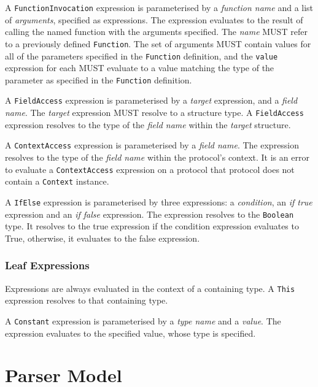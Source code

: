 \documentclass[10pt,twocolumn,a4paper]{article}
\newcommand{\code}[1]{\texttt{#1}}
\begin{document}
A \code{FunctionInvocation} expression is parameterised by a \emph{function name} and a list of
\emph{arguments}, specified as expressions. The expression evaluates to the result of
calling the named function with the arguments specified. The \emph{name} MUST refer to
a previously defined \code{Function}. The set
of arguments MUST contain values for all of the parameters specified
in the \code{Function} definition, and the \code{value} expression for each
MUST evaluate to a value matching the type of the parameter as specified in
the \code{Function} definition.

A \code{FieldAccess} expression is parameterised by a \emph{target} expression, and a
\emph{field name}. The \emph{target} expression MUST resolve to a structure type. A
\code{FieldAccess} expression resolves to the type of the \emph{field name} within the
\emph{target} structure.

A \code{ContextAccess} expression is parameterised by a \emph{field name}. The expression
resolves to the type of the \emph{field name} within the protocol's context.
It is an error to evaluate a \code{ContextAccess} expression on a protocol
that protocol does not contain a \code{Context} instance.

A \code{IfElse} expression is parameterised by three expressions: a \emph{condition},
an \emph{if true} expression and an \emph{if false} expression. The expression resolves
to the \code{Boolean} type. It resolves to the true expression if the condition
expression evaluates to True, otherwise, it evaluates to the false expression.

\subsubsection{Leaf Expressions}

Expressions are always evaluated in the context of a containing type.
A \code{This} expression resolves to that containing type.

A \code{Constant} expression is parameterised by a \emph{type name} and a \emph{value}.
The expression evaluates to the specified value, whose type is specified.

\section{Parser Model}
\label{sec:parser-model}
\end{document}

